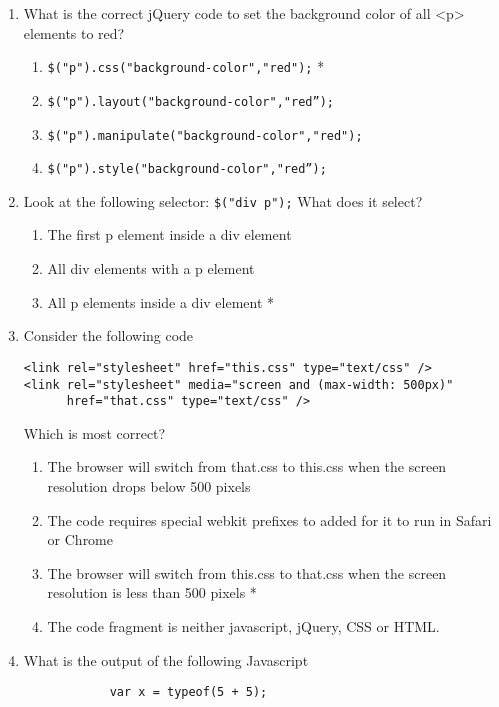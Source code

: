 
\begin{enumerate}
    \item What is the correct jQuery code to set the background color of all <p> elements to red?
        \begin{enumerate}
            \item \texttt{\$("p").css("background-color","red");} *
            \item \texttt{\$("p").layout("background-color","red”);}
            \item \texttt{\$("p").manipulate("background-color","red");}
            \item \texttt{\$("p").style("background-color","red”);}
        \end{enumerate}
    \item Look at the following selector: \texttt{\$("div p");} What does it select?
        \begin{enumerate}
            \item The first p element inside a div element
            \item All div elements with a p element
            \item All p elements inside a div element *
        \end{enumerate}
    \item Consider the following code 
        \begin{verbatim}
<link rel="stylesheet" href="this.css" type="text/css" />
<link rel="stylesheet" media="screen and (max-width: 500px)" 
      href="that.css" type="text/css" />
        \end{verbatim}
        Which is most correct?
        \begin{enumerate}
            \item The browser will switch from that.css to this.css when the screen resolution drops below 500 pixels
            \item The code requires special webkit prefixes to added for it to run in Safari or Chrome
            \item The browser will switch from this.css to that.css when the screen resolution is less than 500 pixels * 
            \item The code fragment is neither javascript, jQuery, CSS or HTML.
        \end{enumerate}
    \item What is the output of the following Javascript
        \begin{verbatim}
            var x = typeof(5 + 5);

\end{verbatim}
\end{enumerate}
